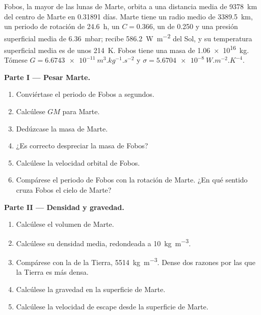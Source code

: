 \begin{problem}
\label{pb:b1:comparative-planetology:1}
Fobos, la mayor de las lunas de Marte, orbita a una distancia media de \qty{9378}{km} del centro
de Marte en \num{0.31891} días. Marte tiene un radio medio de \qty{3389.5}{km}, un periodo de
rotación de \qty{24.6}{h}, un  $C = 0.366$, un  de 0.250
y una presión superficial media de \qty{6.36}{mbar}; recibe \qty{586.2}{W.m^{-2}} del Sol, y su
temperatura superficial media es de unos \qty{214}{K}. Fobos tiene una masa de \qty{1.06e16}{kg}.
Tómese $G = \qty{6.6743e-11}{m^3.kg^{-1}.s^{-2}}$ y $\sigma = \qty{5.6704e-8}{W.m^{-2}.K^{-4}}$.

\medskip
\noindent\textbf{Parte I --- Pesar Marte.}
\begin{enumerate}
  \item Conviértase el periodo de Fobos a segundos.
  \item Calcúlese $GM$ para Marte.
  \item Dedúzcase la masa de Marte.
  \item ¿Es correcto despreciar la masa de Fobos?
  \item Calcúlese la velocidad orbital de Fobos.
  \item Compárese el periodo de Fobos con la rotación de Marte. ¿En qué sentido cruza Fobos el
        cielo de Marte?
\end{enumerate}

\medskip
\noindent\textbf{Parte II --- Densidad y gravedad.}
\begin{enumerate}[resume]
  \item Calcúlese el volumen de Marte.
  \item Calcúlese su densidad media, redondeada a \qty{10}{kg.m^{-3}}.
  \item Compárese con la de la Tierra, \qty{5514}{kg.m^{-3}}. Dense dos razones por las que la
        Tierra es más densa.
  \item Calcúlese la gravedad en la superficie de Marte.
  \item Calcúlese la velocidad de escape desde la superficie de Marte.
\end{enumerate}


\end{problem}
